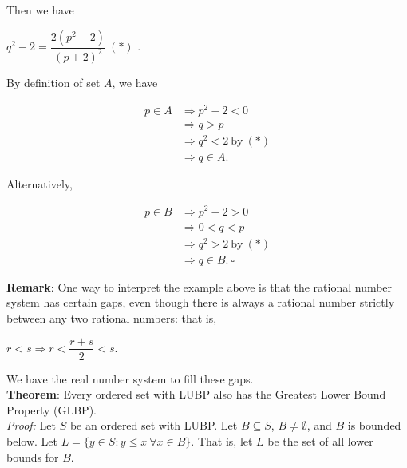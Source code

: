 \documentclass{article}
\begin{document}
Then we have 

\begin{center}
    $q^2-2=\dfrac{2(p^2-2)}{(p+2)^2} \ (*)$ .
\end{center}

By definition of set $A$, we have

\begin{align*}
    p \in A &\Longrightarrow p^2-2<0\\
    &\Longrightarrow q > p\\
    &\Longrightarrow q^2 < 2 \ \text{by} \ (*)\\
    &\Longrightarrow q \in A.
\end{align*}

Alternatively, 

\begin{align*}
    p \in B &\Longrightarrow p^2-2>0\\
    &\Longrightarrow 0<q<p\\
    &\Longrightarrow q^2>2 \ \text{by} \ (*)\\
    &\Longrightarrow q \in B. \ \square
\end{align*}

\textbf{Remark}: One way to interpret the example above is that the rational number system has certain gaps, even though there is always a rational number strictly between any two rational numbers: that is,

\begin{center}
    $r<s \Longrightarrow r< \dfrac{r+s}{2}<s$.
\end{center}

We have the real number system to fill these gaps.\\

\textbf{Theorem}: Every ordered set with LUBP also has the Greatest Lower Bound Property (GLBP).\\

\textit{Proof:} Let $S$ be an ordered set with LUBP. Let $B \subseteq S$, $B \neq \emptyset$, and $B$ is bounded below. Let $L = \{y \in S: y \leq x \ \forall x \in B\}$. That is, let $L$ be the set of all lower bounds for $B$.\\
\end{document}
